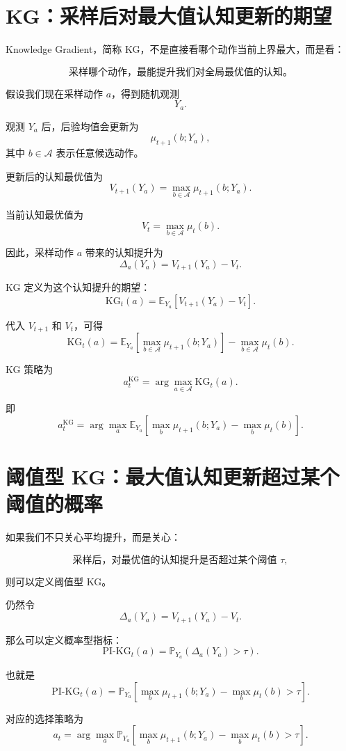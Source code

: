 \documentclass[UTF8,12pt]{ctexart}
\begin{document}
\section{KG：采样后对最大值认知更新的期望}

Knowledge Gradient，简称 KG，不是直接看哪个动作当前上界最大，而是看：

\[
\boxed{
\text{采样哪个动作，最能提升我们对全局最优值的认知。}
}
\]

假设我们现在采样动作 $a$，得到随机观测
\[
Y_a.
\]

观测 $Y_a$ 后，后验均值会更新为
\[
\mu_{t+1}(b;Y_a),
\]
其中 $b\in\mathcal A$ 表示任意候选动作。

更新后的认知最优值为
\[
V_{t+1}(Y_a)
=
\max_{b\in\mathcal A}
\mu_{t+1}(b;Y_a).
\]

当前认知最优值为
\[
V_t
=
\max_{b\in\mathcal A}
\mu_t(b).
\]

因此，采样动作 $a$ 带来的认知提升为
\[
\Delta_a(Y_a)
=
V_{t+1}(Y_a)-V_t.
\]

KG 定义为这个认知提升的期望：
\[
\mathrm{KG}_t(a)
=
\mathbb E_{Y_a}
\left[
V_{t+1}(Y_a)-V_t
\right].
\]

代入 $V_{t+1}$ 和 $V_t$，可得
\[
\mathrm{KG}_t(a)
=
\mathbb E_{Y_a}
\left[
\max_{b\in\mathcal A}
\mu_{t+1}(b;Y_a)
\right]
-
\max_{b\in\mathcal A}
\mu_t(b).
\]

KG 策略为
\[
a_t^{\mathrm{KG}}
=
\arg\max_{a\in\mathcal A}
\mathrm{KG}_t(a).
\]

即
\[
\boxed{
a_t^{\mathrm{KG}}
=
\arg\max_a
\mathbb E_{Y_a}
\left[
\max_b \mu_{t+1}(b;Y_a)
-
\max_b \mu_t(b)
\right].
}
\]

\section{阈值型 KG：最大值认知更新超过某个阈值的概率}

如果我们不只关心平均提升，而是关心：

\[
\text{采样后，对最优值的认知提升是否超过某个阈值 } \tau,
\]

则可以定义阈值型 KG。

仍然令
\[
\Delta_a(Y_a)
=
V_{t+1}(Y_a)-V_t.
\]

那么可以定义概率型指标：
\[
\mathrm{PI\text{-}KG}_t(a)
=
\mathbb P_{Y_a}
\left(
\Delta_a(Y_a)>\tau
\right).
\]

也就是
\[
\mathrm{PI\text{-}KG}_t(a)
=
\mathbb P_{Y_a}
\left[
\max_b \mu_{t+1}(b;Y_a)
-
\max_b \mu_t(b)
>
\tau
\right].
\]

对应的选择策略为
\[
a_t
=
\arg\max_a
\mathbb P_{Y_a}
\left[
\max_b \mu_{t+1}(b;Y_a)
-
\max_b \mu_t(b)
>
\tau
\right].
\]
\end{document}
